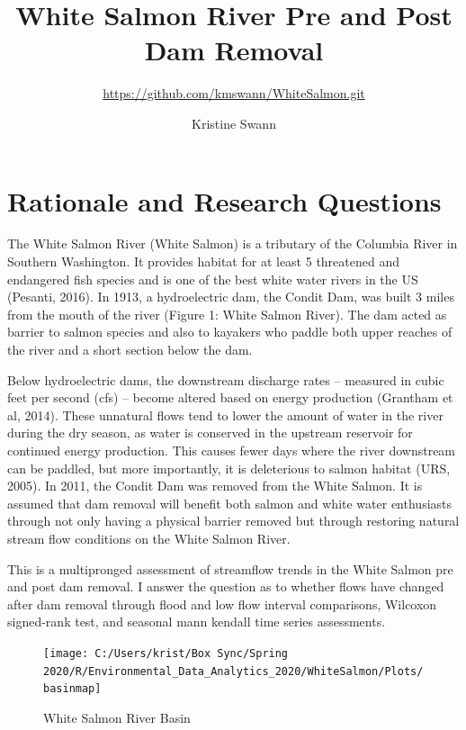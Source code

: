 \documentclass[
  12pt,
]{article}
\title{White Salmon River Pre and Post Dam Removal}
\subtitle{\url{https://github.com/kmswann/WhiteSalmon.git}}
\author{Kristine Swann}
\date{}
\begin{document}
\maketitle

\newpage
\tableofcontents 
\newpage
\listoftables 
\newpage
\listoffigures 
\newpage

\hypertarget{rationale-and-research-questions}{%
\section{Rationale and Research
Questions}\label{rationale-and-research-questions}}

The White Salmon River (White Salmon) is a tributary of the Columbia
River in Southern Washington. It provides habitat for at least 5
threatened and endangered fish species and is one of the best white
water rivers in the US (Pesanti, 2016). In 1913, a hydroelectric dam,
the Condit Dam, was built 3 miles from the mouth of the river (Figure 1:
White Salmon River). The dam acted as barrier to salmon species and also
to kayakers who paddle both upper reaches of the river and a short
section below the dam.

Below hydroelectric dams, the downstream discharge rates -- measured in
cubic feet per second (cfs) -- become altered based on energy production
(Grantham et al, 2014). These unnatural flows tend to lower the amount
of water in the river during the dry season, as water is conserved in
the upstream reservoir for continued energy production. This causes
fewer days where the river downstream can be paddled, but more
importantly, it is deleterious to salmon habitat (URS, 2005). In 2011,
the Condit Dam was removed from the White Salmon. It is assumed that dam
removal will benefit both salmon and white water enthusiasts through not
only having a physical barrier removed but through restoring natural
stream flow conditions on the White Salmon River.

This is a multipronged assessment of streamflow trends in the White
Salmon pre and post dam removal. I answer the question as to whether
flows have changed after dam removal through flood and low flow interval
comparisons, Wilcoxon signed-rank test, and seasonal mann kendall time
series assessments.

\begin{figure}
\texttt{[image: C:/Users/krist/Box Sync/Spring 2020/R/Environmental\_Data\_Analytics\_2020/WhiteSalmon/Plots/basinmap]} \caption{White Salmon River Basin}\label{fig:unnamed-chunk-1}
\end{figure}
\end{document}
